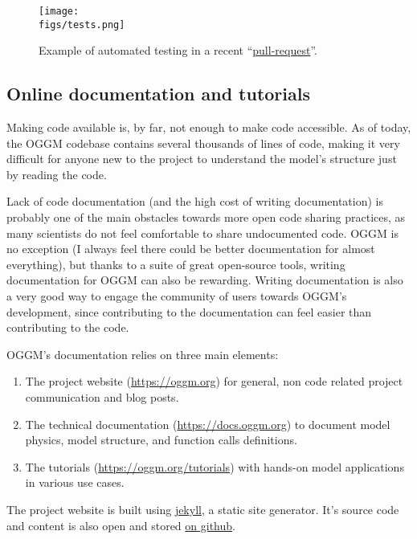 \begin{figure}[h]
\centering
\texttt{[image: \\figs/tests.png]}
\caption{Example of automated testing in a recent “\href{https://github.com/OGGM/oggm/pull/1142}{pull-request}”.}
\end{figure}


\subsection{Online documentation and tutorials}

Making code available is, by far, not enough to make code accessible. As of today, the OGGM codebase contains several
thousands of lines of code, making it very difficult for anyone new to the project to understand the model’s structure
just by reading the code.

Lack of code documentation (and the high cost of writing documentation) is probably one of the main obstacles towards
more open code sharing practices, as many scientists do not feel comfortable to share undocumented code. OGGM is no
exception (I always feel there could be better documentation for almost everything), but thanks to a suite of great
open-source tools, writing documentation for OGGM can also be rewarding. Writing documentation is also a very good way
to engage the community of users towards OGGM’s development, since contributing to the documentation can feel easier
than contributing to the code.

OGGM’s documentation relies on three main elements:
\begin{enumerate}

\item {} 
The project website (\href{https://oggm.org}{https://oggm.org}) for general, non code related project communication and blog posts.

\item {} 
The technical documentation (\href{https://docs.oggm.org}{https://docs.oggm.org}) to document model physics, model structure, and function calls
definitions.

\item {} 
The tutorials (\href{https://oggm.org/tutorials}{https://oggm.org/tutorials}) with hands-on model applications in various use cases.

\end{enumerate}

The project website is built using \href{https://jekyllrb.com/}{jekyll}, a static site generator. It’s source code and
content is also open and stored \href{https://github.com/OGGM/oggm.github.io}{on github}.

